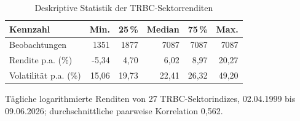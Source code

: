 \begin{table}[htbp]
  \centering
  \footnotesize
  \begin{tabular}{lrrrrr}
    \toprule
    Kennzahl & Min. & 25\,\% & Median & 75\,\% & Max. \\
    \midrule
    Beobachtungen & 1351 & 1877 & 7087 & 7087 & 7087 \\
    Rendite p.a. (\%) & -5,34 & 4,70 & 6,02 & 8,97 & 20,27 \\
    Volatilität p.a. (\%) & 15,06 & 19,73 & 22,41 & 26,32 & 49,20 \\
    \bottomrule
  \end{tabular}
  \caption{Deskriptive Statistik der TRBC-Sektorrenditen}
  \label{tab:daten_deskriptiv}
  \begin{minipage}{\linewidth}\vspace{0.4em}\centering\footnotesize
  Tägliche logarithmierte Renditen von 27 TRBC-Sektorindizes, 02.04.1999 bis 09.06.2026; durchschnittliche paarweise Korrelation 0,562.
  \end{minipage}
\end{table}

